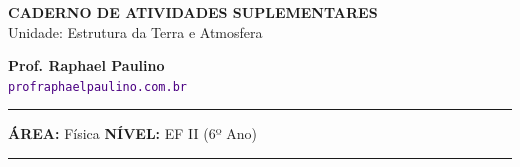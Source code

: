 \documentclass[twoside, 10pt, a4paper]{article}
\begin{document}
\thispagestyle{empty}
\color{Cinzablack}
\vspace*{-1.8cm}

\noindent
\begin{minipage}{\textwidth}
    \selectfont
    \noindent
    \begin{minipage}[t]{0.70\linewidth}
        {\Large \bfseries \MakeUppercase{Caderno de Atividades Suplementares}}\\[0.1cm]
        {\large \textmd{\textcolor{CinzaEscuro}{Unidade: Estrutura da Terra e Atmosfera}}}
    \end{minipage}%
    \begin{minipage}[t]{0.30\linewidth}
        \raggedleft
        \small \textbf{Prof. Raphael Paulino}\\
        \textsf{\small \textcolor{indigo}{\texttt{profraphaelpaulino.com.br}}}
    \end{minipage}
    
    \vspace{0.15cm}
    \noindent\rule{\linewidth}{1.2pt}
    \vspace{-0.1cm}
    \footnotesize\textsf{\textbf{ÁREA:} Física \hfill \textbf{NÍVEL:} EF II (6º Ano)}
    \vspace{0.1cm}
    \noindent\rule{\linewidth}{0.4pt}
\end{minipage}
\end{document}

